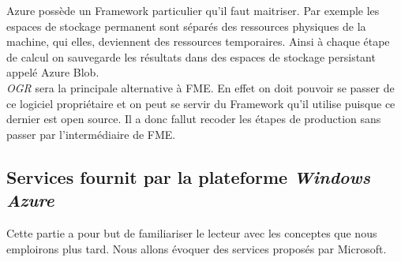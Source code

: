 Azure possède un Framework particulier qu'il faut maitriser. Par
exemple les espaces de stockage permanent sont séparés des ressources
physiques de la machine, qui elles, deviennent des ressources
temporaires. Ainsi à chaque étape de calcul on sauvegarde les
résultats dans des espaces de stockage persistant appelé Azure Blob.\\

 \textit{OGR} sera la principale alternative à FME. En effet on doit
 pouvoir se passer de ce logiciel propriétaire et on peut se servir du
 Framework qu'il utilise puisque ce dernier est open source. Il a donc
 fallut recoder les étapes de production sans passer par
 l'intermédiaire de FME.\\



%
%

\subsection{}




\subsubsection{}

\subsubsection{}

\subsubsection{}









%
%



\subsection{Services fournit par la plateforme \textit{Windows Azure}}
Cette partie a pour but de familiariser le lecteur avec les conceptes
que nous emploirons plus tard. Nous allons évoquer des services
proposés par Microsoft.\\


